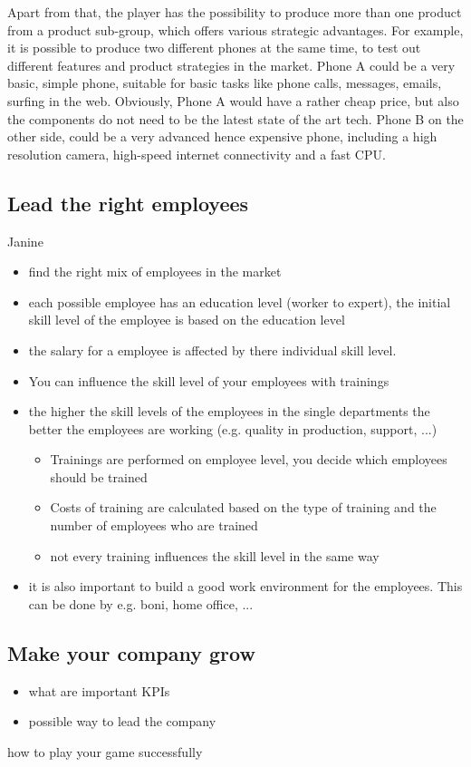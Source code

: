 \documentclass[11pt,titlepage,oneside,openany]{book}
\begin{document}
Apart from that, the player has the possibility to produce more than one product from a product sub-group, which offers various strategic advantages. For example, it is possible to produce two different phones at the same time, to test out different features and product strategies in the market. Phone A could be a very basic, simple phone, suitable for basic tasks like phone calls, messages, emails, surfing in the web. Obviously, Phone A would have a rather cheap price, but also the components do not need to be the latest state of the art tech. Phone B on the other side, could be a very advanced hence expensive phone, including a high resolution camera, high-speed internet connectivity and a fast CPU.

\subsection{Lead the right employees}
Janine
\begin{itemize}
    \item find the right mix of employees in the market 
    \item each possible employee has an education level (worker to expert), the initial skill level of the employee is based on the education level
    \item the salary for a employee is affected by there individual skill level.
    \item You can influence the skill level of your employees with trainings 
    \item the higher the skill levels of the employees in the single departments the better the employees are working (e.g. quality in production, support, ...) 
    \begin{itemize}
    \item Trainings are performed on employee level, you decide which employees should be trained 
    \item Costs of training are calculated based on the type of training and the number of employees who are trained
    \item not every training influences the skill level in the same way 
    \end{itemize}
    \item it is also important to build a good work environment for the employees. This can be done by e.g. boni, home office, ...
\end{itemize}

\subsection{Make your company grow}
\begin{itemize}
    \item what are important KPIs
    \item possible way to lead the company
\end{itemize}
how to play your game successfully
\end{document}
